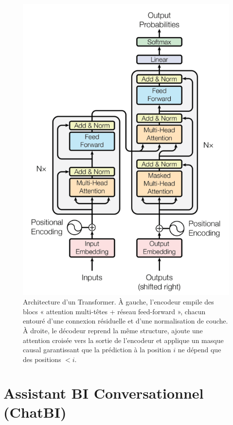 \documentclass[conference]{IEEEtran}
\begin{document}
\begin{figure}[ht]
    \centering
    \includegraphics[width=1\linewidth]{figures/transformer.png}
    \caption{Architecture d’un Transformer. À gauche, l’encodeur empile des blocs « attention multi-têtes + réseau feed-forward », chacun entouré d’une connexion résiduelle et d’une normalisation de couche. À droite, le décodeur reprend la même structure, ajoute une attention croisée vers la sortie de l’encodeur et applique un masque causal garantissant que la prédiction à la position $i$ ne dépend que des positions $<i$.}
    \label{fig:transformer-architecture}
\end{figure}

\section{Assistant BI Conversationnel (ChatBI)}
\label{sec:chatbi}
\end{document}
